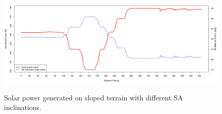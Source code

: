\begin{figure}[h]
  \captionsetup[subfigure]{justification=centering}
  \centering
  \hypersetup{linkcolor=captionTextColor}
  \includegraphics[width=0.9\linewidth]{sections/design/simulation/plots/counter-slope-plot.png}\\
  \caption[Solar power generated on sloped terrain with different SA inclinations.]
          {Solar power generated on sloped terrain with different SA inclinations.}
  \label{fig:rover-counter-slope-measurements}
\end{figure}
